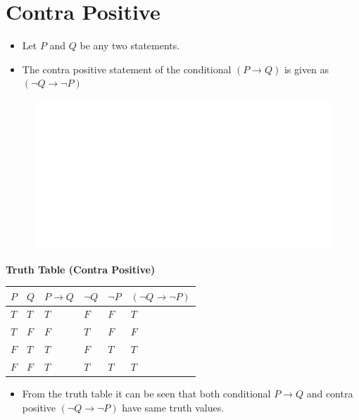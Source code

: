 \documentclass[]{book}
\providecommand{\tightlist}{%
  \setlength{\itemsep}{0pt}\setlength{\parskip}{0pt}}
\begin{document}
\hypertarget{contra-positive}{%
\section{Contra Positive}\label{contra-positive}}

\begin{itemize}
\tightlist
\item
  Let \(P\) and \(Q\) be any two statements.
\item
  The contra positive statement of the conditional \((P \rightarrow Q)\) is given as \((\lnot Q \rightarrow \lnot P)\)
\end{itemize}

\begin{figure}

{\centering \includegraphics[width=1\linewidth]{figure/boxC33-1} 

}

\end{figure}

\textbf{Truth Table (Contra Positive)}

\begin{longtable}[]{@{}llllll@{}}
\toprule
\(P\) & \(Q\) & \(P \rightarrow Q\) & \(\lnot Q\) & \(\lnot P\) & \((\lnot Q \rightarrow \lnot P)\)\tabularnewline
\midrule
\endhead
\(T\) & \(T\) & \(T\) & \(F\) & \(F\) & \(T\)\tabularnewline
\(T\) & \(F\) & \(F\) & \(T\) & \(F\) & \(F\)\tabularnewline
\(F\) & \(T\) & \(T\) & \(F\) & \(T\) & \(T\)\tabularnewline
\(F\) & \(F\) & \(T\) & \(T\) & \(T\) & \(T\)\tabularnewline
\bottomrule
\end{longtable}

\begin{itemize}
\tightlist
\item
  From the truth table it can be seen that both conditional \(P \rightarrow Q\) and contra positive \((\lnot Q \rightarrow \lnot P)\) have same truth values.
\end{itemize}
\end{document}
